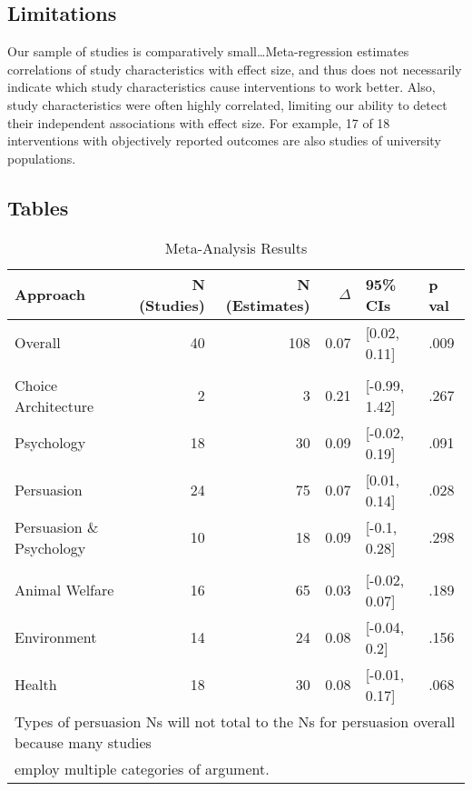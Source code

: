 \documentclass[sn-nature,referee,pdflatex]{sn-jnl}
\begin{document}
\subsection{Limitations}\label{limitations}

Our sample of studies is comparatively small\ldots Meta-regression
estimates correlations of study characteristics with effect size, and
thus does not necessarily indicate which study characteristics cause
interventions to work better. Also, study characteristics were often
highly correlated, limiting our ability to detect their independent
associations with effect size. For example, 17 of 18 interventions with
objectively reported outcomes are also studies of university
populations.

\newpage

\subsection{Tables}\label{tables}

\begin{table}[!h]
\centering
\caption{\label{tab:table_one}Meta-Analysis Results}
\centering
\begin{tabular}[t]{lrrrll}
\toprule
Approach & N (Studies) & N (Estimates) & $\Delta$ & 95\% CIs & p val\\
\midrule
Overall & 40 & 108 & 0.07 & {}[0.02, 0.11] & .009\\
\addlinespace[0.5em]
\multicolumn{6}{l}{\textbf{Theory}}\\
\hspace{1em}Choice Architecture & 2 & 3 & 0.21 & {}[-0.99, 1.42] & .267\\
\hspace{1em}Psychology & 18 & 30 & 0.09 & {}[-0.02, 0.19] & .091\\
\hspace{1em}Persuasion & 24 & 75 & 0.07 & {}[0.01, 0.14] & .028\\
\hspace{1em}Persuasion \& Psychology & 10 & 18 & 0.09 & {}[-0.1, 0.28] & .298\\
\addlinespace[0.5em]
\multicolumn{6}{l}{\textbf{Type of Persuasion}}\\
\hspace{1em}Animal Welfare & 16 & 65 & 0.03 & {}[-0.02, 0.07] & .189\\
\hspace{1em}Environment & 14 & 24 & 0.08 & {}[-0.04, 0.2] & .156\\
\hspace{1em}Health & 18 & 30 & 0.08 & {}[-0.01, 0.17] & .068\\
\bottomrule
\multicolumn{6}{l}{\textsuperscript{} Types of persuasion Ns will not total to the Ns for persuasion overall because many studies}\\
\multicolumn{6}{l}{employ multiple categories of argument.}\\
\end{tabular}
\end{table}
\end{document}
